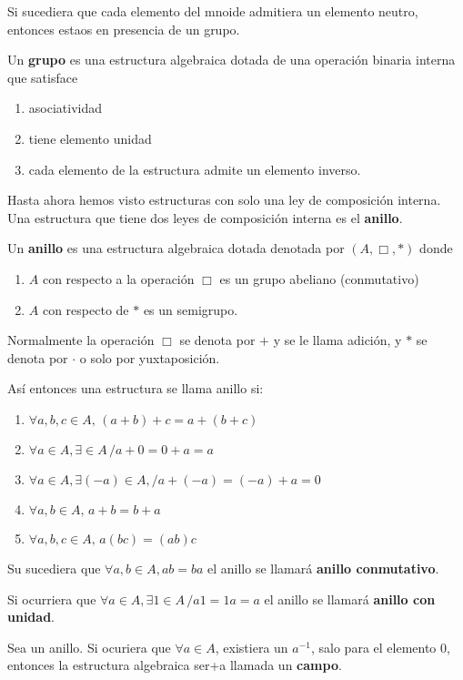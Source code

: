 Si sucediera que cada elemento del mnoide admitiera un elemento neutro, entonces estaos en presencia de un grupo.

\begin{defi}
	Un \textbf{grupo} es una estructura algebraica dotada de una operación binaria interna que satisface
	\begin{enumerate}
		\item asociatividad
		\item tiene elemento unidad
		\item cada elemento de la estructura admite un elemento inverso.
	\end{enumerate}
\end{defi}

Hasta ahora hemos visto estructuras con solo una ley de composición interna. Una estructura que tiene dos leyes de composición interna es el \textbf{anillo}.

\begin{defi}
	Un \textbf{anillo} es una estructura algebraica dotada denotada por $(A,\Box,*)$ donde
	\begin{enumerate}
		\item $A$ con respecto a la operación $\Box$ es un grupo abeliano (conmutativo)
		\item $A$ con respecto de $*$ es un semigrupo.
	\end{enumerate}
\end{defi}
Normalmente la operación $\Box$ se denota por $+$ y se le llama adición, y $*$ se denota por $\cdot$ o solo por yuxtaposición.

Así entonces una estructura \anillo se llama anillo si:
\begin{enumerate}
	\item $\forall a,b,c\in A, \, (a+b)+c=a+(b+c)$
	\item $\forall a\in A, \exists \in A\,/ a+0=0+a=a$
	\item $\forall a\in A, \exists (-a)\in A, / a+(-a)=(-a)+a=0$
	\item $\forall a,b\in A,\, a+b=b+a$
	\item $\forall a,b,c\in A,\, a(bc)=(ab)c$
\end{enumerate}

Su sucediera que $\forall a,b \in A, ab=ba$ el anillo se llamará \textbf{anillo conmutativo}.

Si ocurriera que $\forall a\in A, \exists 1\in A\, /a1=1a=a$ el anillo se llamará \textbf{anillo con unidad}.

\begin{defi}
	Sea \anillo un anillo. Si ocuriera que $\forall a\in A$, existiera un $a^{-1}$, salo para el elemento $0$, entonces la estructura algebraica ser+a llamada un \textbf{campo}. 
\end{defi}






























